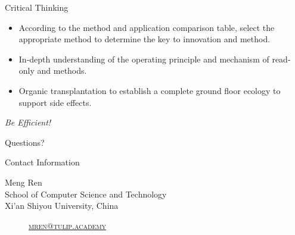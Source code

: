 \documentclass[
 size=14pt,
 paper=smartboard,  %
 mode=present, 		%
 display=slides, 	%
 style=tuliplab,  	%
 pauseslide,
 fleqn,leqno]{powerdot}{}
\begin{document}
\begin{slide}[toc=,bm=]{Critical Thinking}

\begin{itemize}
  \item According to the method and application comparison table,
  select the appropriate method to determine the key to innovation and method.
  \item In-depth understanding of the operating principle and mechanism of read-only and methods.
  \item Organic transplantation to establish a complete ground floor ecology to support side effects.
\end{itemize}

\begin{center}
\Large{\textit{Be Efficient!}}
\end{center}

\end{slide}

%
\begin{slide}[toc=,bm=]{Questions?}
\begin{center}
\begin{figure}
\end{figure}
\end{center}
\end{slide}

\begin{wideslide}[toc=,bm=]{Contact Information}
\centering
{}
\twocolumn[
lcolwidth=0.35\linewidth,
rcolwidth=0.65\linewidth
]
{
}
{
Meng Ren\\
School of Computer Science and Technology\\
Xi'an Shiyou University, China
\begin{description}
 \item[\textcolor{orange}{\faEnvelope}] \href{mailto:mren@tulip.academy}
 {\textsc{\footnotesize{mren@tulip.academy}}}

\end{description}
}
\end{wideslide}
\end{document}
